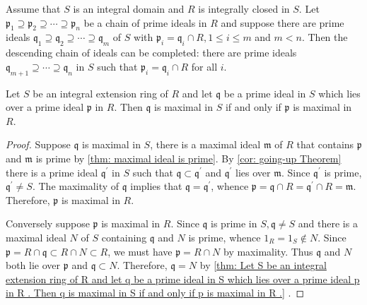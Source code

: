 \documentclass[12pt, oneside]{book}
\begin{document}
\begin{theorem} 
    Assume that $S$ is an integral domain and $R$ is integrally closed in $S$. Let $\mathfrak{p}_1 \supseteq \mathfrak{p}_2 \supseteq \cdots \supseteq \mathfrak{p}_n$ be a chain of prime ideals in $R$ and suppose there are prime ideals $\mathfrak{q}_1 \supseteq \mathfrak{q}_2 \supseteq \cdots \supseteq \mathfrak{q}_m$ of $S$ with $\mathfrak{p}_i=\mathfrak{q}_i \cap R, 1 \leq i \leq m$ and $m<n$. Then the descending chain of ideals can be completed: there are prime ideals $\mathfrak{q}_{m+1} \supseteq \cdots \supseteq \mathfrak{q}_n$ in $S$ such that $\mathfrak{p}_i=\mathfrak{q}_i \cap R$ for all $i$.
\end{theorem}















\begin{theorem}
    \label{thm: Let S be an integral extension ring of R and let q be a prime ideal in S which
        lies over a prime ideal p in R . Then q is maximal in S if and only if p is maximal in R .}
    Let $S$ be an integral extension ring of $R$ and let $\mathfrak{q}$ be a prime ideal in $S$ which lies over a prime ideal $\mathfrak{p}$ in $R$.
    Then $\mathfrak{q}$ is maximal in $S$ if and only if $\mathfrak{p}$ is maximal in $R$.

    \begin{proof}
        Suppose $\mathfrak{q}$ is maximal in $S$, there is a maximal ideal $\mathfrak{m}$ of $R$ that contains $\mathfrak{p}$ and $\mathfrak{m}$ is prime by \ref{thm: maximal ideal is prime}.
        By \ref{cor: going-up Theorem} there is a prime ideal $\mathfrak{q}^{\prime}$ in $S$ such that $\mathfrak{q} \subset \mathfrak{q}^{\prime}$ and $\mathfrak{q}^{\prime}$ lies over $\mathfrak{m}$. Since $\mathfrak{q}^{\prime}$ is prime, $\mathfrak{q}^{\prime} \neq S$.
        The maximality of $\mathfrak{q}$ implies that $\mathfrak{q}=\mathfrak{q}^{\prime}$, whence $\mathfrak{p}=\mathfrak{q} \cap R=\mathfrak{q}^{\prime} \cap R=\mathfrak{m}$. Therefore, $\mathfrak{p}$ is maximal in $R$.

        Conversely suppose $\mathfrak{p}$ is maximal in $R$. Since $\mathfrak{q}$ is prime in $S, \mathfrak{q} \neq S$ and there is a maximal ideal $N$ of $S$ containing $\mathfrak{q}$ and $N$ is prime, whence $1_R=1_S \notin N$. Since $\mathfrak{p}=R \cap \mathfrak{q} \subset R \cap N \subset R$, we must have $\mathfrak{p}=R \cap N$ by maximality. Thus $\mathfrak{q}$ and $N$ both lie over $\mathfrak{p}$ and $\mathfrak{q} \subset N$. Therefore, $\mathfrak{q}=N$ by \ref{thm: Let S be an integral extension ring of R and let q be a prime ideal in S which lies over a prime ideal p in R . Then q is maximal in S if and only if p is maximal in R .} .
    \end{proof}
\end{theorem}
\end{document}

